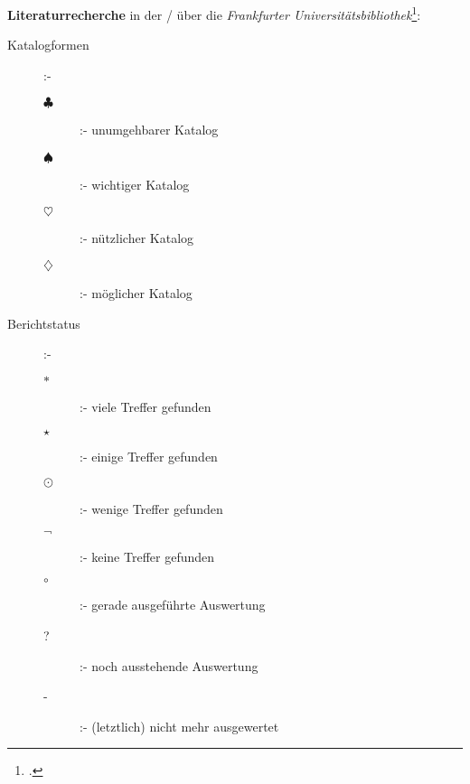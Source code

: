\documentclass[
  DIV=calc,
  BCOR=5mm,
  11pt,
  headings=small,
  oneside,
  abstract=true,
  toc=bib,
  english,ngerman]{scrartcl}
\newcommand{\NecessaryCatalog}{$\clubsuit$}
\newcommand{\NecessaryCatalogDefinition}{unumgehbarer Katalog}
\newcommand{\ImportantCatalog}{$\spadesuit$}
\newcommand{\ImportantCatalogDefinition}{wichtiger Katalog}
\newcommand{\UsefulCatalog}{$\heartsuit$}
\newcommand{\UsefulCatalogDefinition}{nützlicher Katalog}
\newcommand{\PossibleCatalog}{$\diamondsuit$}
\newcommand{\PossibleCatalogDefinition}{möglicher Katalog}
\newcommand{\many}{$\ast$}
\newcommand{\manyDef}{viele Treffer gefunden}
\newcommand{\some}{$\star$}
\newcommand{\someDef}{einige Treffer gefunden}
\newcommand{\few}{$\odot$}
\newcommand{\fewDef}{wenige Treffer gefunden}
\newcommand{\nothing}{$\neg$}
\newcommand{\nothingDef}{keine Treffer gefunden}
\newcommand{\ongoing}{$\circ$}
\newcommand{\ongoingDef}{gerade ausgeführte Auswertung}
\newcommand{\open}{?}
\newcommand{\openDef}{noch ausstehende Auswertung}
\newcommand{\ignored}{-}
\newcommand{\ignoredDef}{(letztlich) nicht mehr ausgewertet}
\begin{document}
\textbf{Literaturrecherche} in der / über die
\emph{Frankfurter Universitätsbibliothek}\footcite[s.][n.P.]{UbFaM2018a}:


\begin{description}
  \item[Katalogformen] :-
    \begin{description}
      \item[\NecessaryCatalog] :- \NecessaryCatalogDefinition
      \item[\ImportantCatalog] :- \ImportantCatalogDefinition
      \item[\UsefulCatalog] :- \UsefulCatalogDefinition
      \item[\PossibleCatalog] :- \PossibleCatalogDefinition
    \end{description}
  \item[Berichtstatus] :-
    \begin{description}
      \item[\many] :- \manyDef
      \item[\some] :- \someDef
      \item[\few] :- \fewDef
      \item[\nothing] :- \nothingDef
      \item[\ongoing] :- \ongoingDef
      \item[\open] :- \openDef
      \item[\ignored] :- \ignoredDef
    \end{description}
\end{description}
\end{document}
